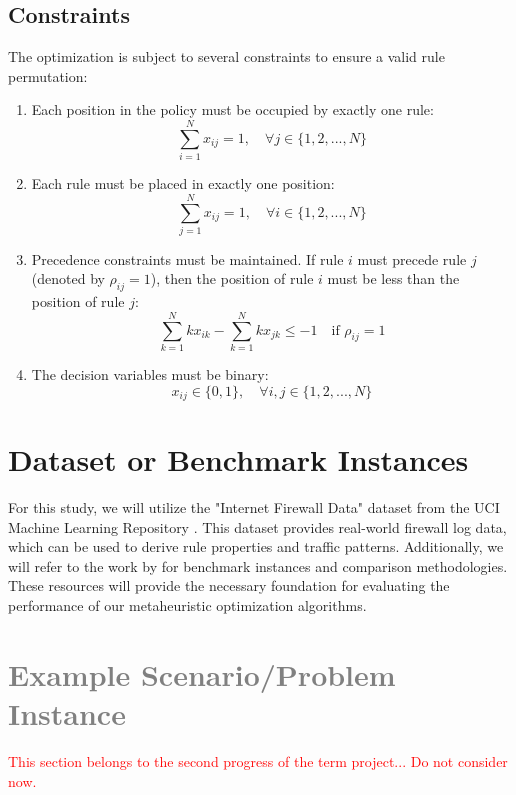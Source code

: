 \documentclass[12pt,a4paper]{article}
\begin{document}
\subsection{Constraints}
The optimization is subject to several constraints to ensure a valid rule permutation:
\begin{enumerate}
    \item Each position in the policy must be occupied by exactly one rule:
    \begin{equation}
    \sum_{i=1}^{N} x_{ij} = 1, \quad \forall j \in \{1, 2, ..., N\}
    \end{equation}
    \item Each rule must be placed in exactly one position:
    \begin{equation}
    \sum_{j=1}^{N} x_{ij} = 1, \quad \forall i \in \{1, 2, ..., N\}
    \end{equation}
    \item Precedence constraints must be maintained. If rule $i$ must precede rule $j$ (denoted by $\rho_{ij} = 1$), then the position of rule $i$ must be less than the position of rule $j$:
    \begin{equation}
    \sum_{k=1}^{N} k x_{ik} - \sum_{k=1}^{N} k x_{jk} \leq -1 \quad \text{if } \rho_{ij} = 1
    \end{equation}
    \item The decision variables must be binary:
    \begin{equation}
    x_{ij} \in \{0, 1\}, \quad \forall i, j \in \{1, 2, ..., N\}
    \end{equation}
\end{enumerate}

\section{Dataset or Benchmark Instances}
For this study, we will utilize the "Internet Firewall Data" dataset from the UCI Machine Learning Repository \citep{internet_firewall_data_542}. This dataset provides real-world firewall log data, which can be used to derive rule properties and traffic patterns. Additionally, we will refer to the work by \citet{coscia2023innovative} for benchmark instances and comparison methodologies. These resources will provide the necessary foundation for evaluating the performance of our metaheuristic optimization algorithms.

\section{\textcolor{gray}{Example Scenario/Problem Instance}}
\textcolor{red}{This section belongs to the second progress of the term project... Do not consider now.}
\end{document}
